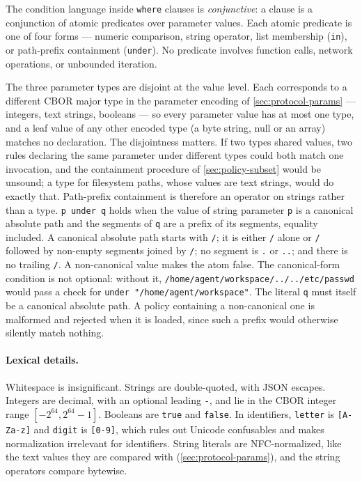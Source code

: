 \documentclass[11pt,a4paper]{article}
\begin{document}
The condition language inside \texttt{where} clauses is
\emph{conjunctive}: a clause is a conjunction of atomic predicates over
parameter values. Each atomic predicate is one of four forms --- numeric
comparison, string operator, list membership (\texttt{in}), or
path-prefix containment (\texttt{under}). No predicate involves function
calls, network operations, or unbounded iteration.

The three parameter types are disjoint at the value level. Each
corresponds to a different CBOR major type in the parameter encoding of
\cref{sec:protocol-params} --- integers, text strings, booleans --- so
every parameter value has at most one type, and a leaf value of any
other encoded type (a byte string, null or an array) matches no
declaration. The disjointness matters. If two types shared values, two
rules declaring the same parameter under different types could both
match one invocation, and the containment procedure of
\cref{sec:policy-subset} would be unsound; a type for filesystem paths,
whose values are text strings, would do exactly that. Path-prefix
containment is therefore an operator on strings rather than a type.
\texttt{p under q} holds when the value of string parameter
\texttt{p} is a canonical absolute path and the segments of \texttt{q}
are a prefix of its segments, equality included. A canonical absolute
path starts with \texttt{/}; it is either \texttt{/} alone or
\texttt{/} followed by non-empty segments joined by \texttt{/}; no
segment is \texttt{.} or \texttt{..}; and there is no trailing
\texttt{/}. A non-canonical value makes the atom false. The canonical-form condition is not optional:
without it, \texttt{/home/agent/workspace/../../etc/passwd} would pass
a check for \texttt{under "/home/agent/workspace"}. The literal
\texttt{q} must itself be a canonical absolute path. A policy containing
a non-canonical one is malformed and rejected when it is loaded, since
such a prefix would otherwise silently match nothing.

\paragraph{Lexical details.}
Whitespace is insignificant. Strings are double-quoted, with JSON
escapes. Integers are decimal, with an optional leading \texttt{-}, and
lie in the CBOR integer range $[-2^{64}, 2^{64}-1]$. Booleans are
\texttt{true} and \texttt{false}. In identifiers, \texttt{letter} is
\texttt{[A-Za-z]} and \texttt{digit} is \texttt{[0-9]}, which rules out
Unicode confusables and makes normalization irrelevant for identifiers.
String literals are NFC-normalized, like the text values they are
compared with (\cref{sec:protocol-params}), and the string operators
compare bytewise.
\end{document}
